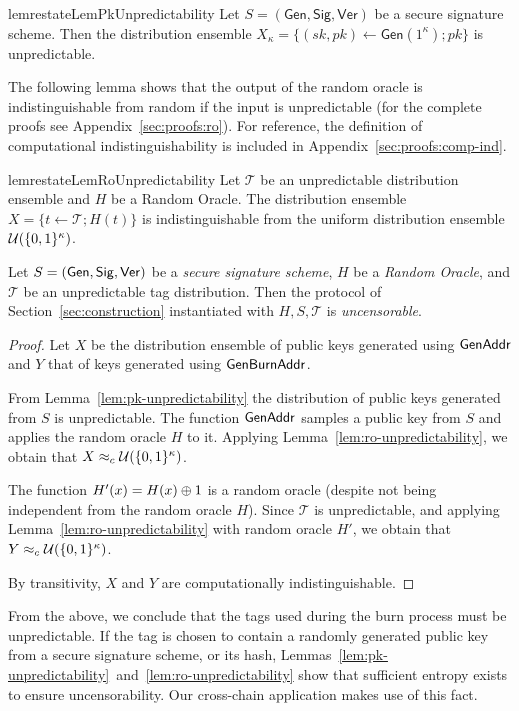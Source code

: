\begin{restatable}{lem}{restateLemPkUnpredictability}
  \label{lem:pk-unpredictability}
  Let $S = (\textsf{Gen}, \textsf{Sig}, \textsf{Ver})$ be a secure signature scheme.
  Then the distribution ensemble
  $X_\kappa = \{(sk, pk) \gets \textsf{Gen}(1^\kappa); pk\}$ is
  unpredictable.
\end{restatable}

The following lemma shows that the output of the random oracle is
indistinguishable from random if the input is unpredictable
(for the complete proofs see Appendix~\ref{sec:proofs:ro}).
For reference, the
definition of computational indistinguishability is included in
Appendix~\ref{sec:proofs:comp-ind}.

\begin{restatable}{lem}{restateLemRoUnpredictability}
  \label{lem:ro-unpredictability}
  Let $\mathcal{T}$ be an unpredictable distribution ensemble and $H$ be a
  Random Oracle.
  The distribution ensemble $X = \{t \gets \mathcal{T}; H(t)\}$ is indistinguishable from
  the uniform distribution ensemble $\mathcal{U}(\{0,1\}^\kappa)$.
\end{restatable}

\begin{theorem}[Uncensorability]
  Let $S = (\mathsf{Gen}, \mathsf{Sig}, \mathsf{Ver})$ be a \emph{secure signature scheme},
  $H$ be a \emph{Random Oracle},
  and $\mathcal{T}$ be an unpredictable tag distribution.
  Then the protocol of Section~\ref{sec:construction} instantiated with
  $H, S, \mathcal{T}$ is \emph{uncensorable}.
\end{theorem}
\begin{proof}
  Let $X$ be the distribution ensemble of public keys generated using $\mathsf{GenAddr}$
  and $Y$ that of keys generated using $\mathsf{Gen}\-\mathsf{Burn}\-\mathsf{Addr}$.

  From Lemma~\ref{lem:pk-unpredictability} the distribution of
  public keys generated from $S$ is unpredictable. The
  function $\mathsf{GenAddr}$ samples a public key from $S$ and applies the
  random oracle $H$ to it. Applying
  Lemma~\ref{lem:ro-unpredictability}, we obtain that
  $X \approx_c \mathcal{U}(\{0, 1\}^\kappa)$.

  The function $H'(x) = H(x) \oplus 1$ is a random oracle (despite not
  being independent from the random oracle $H$).
  Since $\mathcal{T}$ is unpredictable, and
  applying Lemma~\ref{lem:ro-unpredictability} with random oracle $H'$, we
  obtain that $Y \approx_c \mathcal{U}(\{0, 1\}^\kappa)$.

  By transitivity, $X$ and $Y$ are computationally indistinguishable.
\end{proof}

From the above, we conclude that the tags used during the burn process must be
unpredictable. If the tag is chosen to contain a randomly generated public key
from a secure signature scheme, or its hash,
Lemmas~\ref{lem:pk-unpredictability}~and~\ref{lem:ro-unpredictability} show that
sufficient entropy exists to ensure uncensorability. Our cross-chain application
makes use of this fact.
